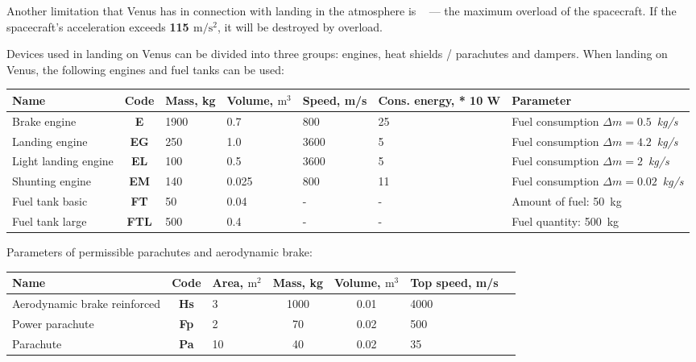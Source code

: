 \documentclass[12pt,a4paper]{article}
\begin{document}
Another limitation that Venus has in connection with landing in the atmosphere is ~ --- the maximum overload of the spacecraft. If the spacecraft's acceleration exceeds \textbf{115 $\text{m}/\text{s}^2$},
it will be destroyed by overload.

Devices used in landing on Venus can be divided into three groups: engines, heat shields / parachutes and dampers. When landing on Venus, the following engines and fuel tanks can be used:

\begin{center}
\begin{tabular}{ |p{2.5cm}|c|p{1.5cm}|p{1.5cm}|p{2cm}|p{2cm}|p{2.5cm}| }
  \hline
 \textbf{Name} & \textbf{Code} & \textbf{Mass, kg} & \textbf{Volume, $\text{m}^3$} &
   \textbf{Speed, m/s} & \textbf{Cons. energy, * 10 W} & \textbf{Parameter}\\
   \hline
   Brake engine & \textbf{E} & 1900 & 0.7 & 800 & 25 & Fuel consumption $\Delta m =
   0.5$~\emph{kg/s}\\
   \hline
   Landing engine & \textbf{EG} & 250 & 1.0 & 3600 & 5 & Fuel consumption $\Delta m =
   4.2$~\emph{kg/s}\\
   \hline
   Light landing engine & \textbf{EL} & 100 & 0.5 & 3600 & 5 & Fuel consumption $\Delta m =
   2$~\emph{kg/s}\\
   \hline
   Shunting engine & \textbf{EM} & 140 & 0.025 & 800 & 11 & Fuel consumption $\Delta m =
   0.02$~\emph{kg/s}\\
   \hline
   Fuel tank basic & \textbf{FT} & 50 & 0.04 & - & - & Amount of fuel: 50~kg\\
   \hline
   Fuel tank large & \textbf{FTL} & 500 & 0.4 & - & - & Fuel quantity: 500~kg\\
   \hline
\end{tabular}
\end{center}

Parameters of permissible parachutes and aerodynamic brake:

\begin{center}
\begin{tabular}{ |p{4cm}|c|p{2cm}|c|c|p{2cm}|p{2cm}| }
   \hline
   \textbf{Name} & \textbf{Code} & \textbf{Area, $\text{m}^2$} & \textbf{Mass, kg} &
   \textbf{Volume, $\text{m}^3$} &\textbf{Top speed, m/s} \\
   \hline
   Aerodynamic brake reinforced & \textbf{Hs} & 3 & 1000 & 0.01 & 4000 \\
   \hline
   Power parachute & \textbf{Fp} & 2 & 70 & 0.02 & 500\\
   \hline
   Parachute & \textbf{Pa} & 10 & 40 & 0.02 & 35 \\
   \hline
\end{tabular}
\end{center}
\end{document}

